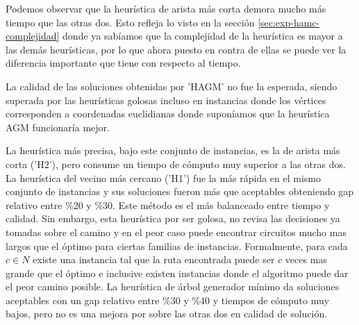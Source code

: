 \documentclass[10pt,a4paper]{article}
\begin{document}
Podemos observar que la heurística de arista más corta demora mucho más tiempo que las otras dos. Esto refleja lo visto en la sección \ref{sec:exp-hamc-complejidad} donde ya sabíamos que la complejidad de la heurística es mayor a las demás heurísticas, por lo que ahora puesto en contra de ellas se puede ver la diferencia importante que tiene con respecto al tiempo.

La calidad de las soluciones obtenidas por 'HAGM' no fue la esperada, siendo superada por las heurísticas golosas incluso en instancias donde los vértices corresponden a coordenadas euclidianas donde suponíamos que la heurística AGM funcionaría mejor.

La heurística más precisa, bajo este conjunto de instancias, es la de arista más corta ('H2'), pero consume un tiempo de cómputo muy superior a las otras dos.
La heurística del vecino más cercano ('H1') fue la más rápida en el mismo conjunto de instancias y sus soluciones fueron más que aceptables obteniendo gap relativo entre \%20 y \%30. Este método es el más balanceado entre tiempo y calidad. Sin embargo, esta heurística por ser golosa, no revisa las decisiones ya tomadas sobre el camino y en el peor caso puede encontrar circuitos mucho mas largos que el óptimo para ciertas familias de instancias. Formalmente, para cada $c \in N$ existe una instancia tal que la ruta encontrada puede ser $c$ veces mas grande que el óptimo e inclusive existen instancias donde el algoritmo puede dar el peor camino posible. \cite{teo:Neig}
La heurística de árbol generador mínimo da soluciones aceptables con un gap relativo entre \%30 y \%40 y tiempos de cómputo muy bajos, pero no es una mejora por sobre las otras dos en calidad de solución.
\end{document}

